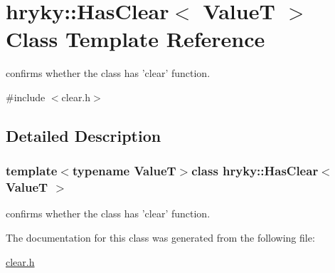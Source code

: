 \hypertarget{classhryky_1_1_has_clear}{\section{hryky\-:\-:Has\-Clear$<$ Value\-T $>$ Class Template Reference}
\label{classhryky_1_1_has_clear}
}


confirms whether the class has 'clear' function.  




{\ttfamily \#include $<$clear.\-h$>$}



\subsection{Detailed Description}
\subsubsection*{template$<$typename Value\-T$>$class hryky\-::\-Has\-Clear$<$ Value\-T $>$}

confirms whether the class has 'clear' function. 

The documentation for this class was generated from the following file\-:\begin{DoxyCompactItemize}
\item 
\hyperlink{clear_8h}{clear.\-h}\end{DoxyCompactItemize}
